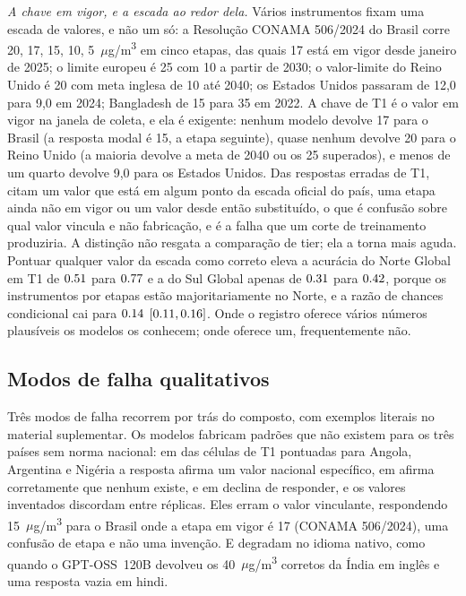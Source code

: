 \emph{A chave em vigor, e a escada ao redor dela.} Vários instrumentos fixam
uma escada de valores, e não um só: a Resolução CONAMA 506/2024 do Brasil corre
20, 17, 15, 10, 5~$\mu$g/m\textsuperscript{3} em cinco etapas, das quais 17
está em vigor desde janeiro de 2025; o limite europeu é 25 com 10 a partir de
2030; o valor-limite do Reino Unido é 20 com meta inglesa de 10 até 2040; os
Estados Unidos passaram de 12,0 para 9,0 em 2024; Bangladesh de 15 para 35 em
2022. A chave de T1 é o valor em vigor na janela de coleta, e ela é exigente:
nenhum modelo devolve 17 para o Brasil (a resposta modal é 15, a etapa
seguinte), quase nenhum devolve 20 para o Reino Unido (a maioria devolve a
meta de 2040 ou os 25 superados), e menos de um quarto devolve 9,0 para os
Estados Unidos. Das \nincorrectn{} respostas erradas de T1, \nladderhit{} citam
um valor que está em algum ponto da escada oficial do país, uma etapa ainda não
em vigor ou um valor desde então substituído, o que é confusão sobre qual valor
vincula e não fabricação, e é a falha que um corte de treinamento produziria. A
distinção não resgata a comparação de tier; ela a torna mais aguda. Pontuar
qualquer valor da escada como correto eleva a acurácia do Norte Global em T1
de $0.51$ para $0.77$ e a do Sul Global apenas de $0.31$ para
$0.42$, porque os instrumentos por etapas estão majoritariamente no
Norte, e a razão de chances condicional cai para $0.14$ $[0.11,0.16]$.
Onde o registro oferece vários números plausíveis os modelos os conhecem; onde
oferece um, frequentemente não.

\subsection{Modos de falha qualitativos}
\label{sec:res:qualitativo}

Três modos de falha recorrem por trás do composto, com exemplos literais no
material suplementar. Os modelos fabricam padrões que não existem para os três
países sem norma nacional: em \nnsfab{} das \nnscells{} células de T1 pontuadas
para Angola, Argentina e Nigéria a resposta afirma um valor nacional
específico, em \nnsabst{} afirma corretamente que nenhum existe, e em \nnsdk{}
declina de responder, e os valores inventados discordam entre réplicas. Eles
erram o valor vinculante, respondendo 15~$\mu$g/m\textsuperscript{3} para o
Brasil onde a etapa em vigor é 17 (CONAMA 506/2024), uma confusão de etapa e
não uma invenção. E degradam no idioma nativo, como quando o GPT-OSS~120B
devolveu os 40~$\mu$g/m\textsuperscript{3} corretos da Índia em inglês e uma
resposta vazia em hindi.

